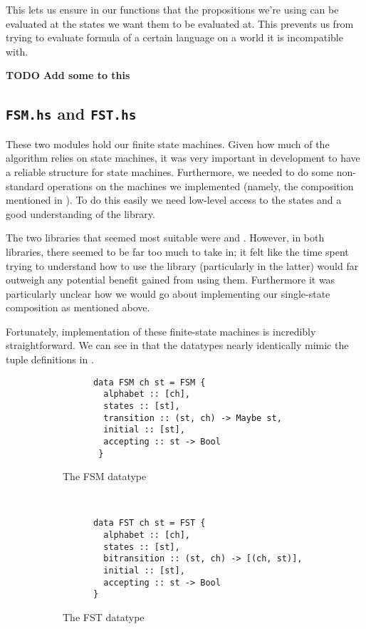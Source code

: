 \documentclass[12pt, a4paper]{article}
\begin{document}
This lets us ensure in our functions that the propositions we're using can be
evaluated at the states we want them to be evaluated at. This prevents us from
trying to evaluate formula of a certain language on a world it is incompatible
with.

\textbf{TODO Add some to this}

\subsection{\texttt{FSM.hs} and \texttt{FST.hs}}

These two modules hold our finite state machines. Given how much of the
algorithm relies on state machines, it was very important in development to have
a reliable structure for state machines. Furthermore, we needed to do some
non-standard operations on the machines we implemented (namely, the composition
mentioned in ). To do this easily we need
low-level access to the states and a good understanding of the library. 

The two libraries that seemed most suitable were \cite{HaskellFST} and
\cite{HaskellMachines}. However, in both libraries, there seemed to be far too
much to take in; it felt like the time spent trying to understand how to use the
library (particularly in the latter) would far outweigh any potential benefit
gained from using them. Furthermore it was particularly unclear how we would go
about implementing our single-state composition as mentioned above.

\bigskip

Fortunately, implementation of these finite-state machines is incredibly
straightforward. We can see in  that the datatypes nearly
identically mimic the tuple definitions in .


\begin{figure}[h]
  \centering
  \begin{subfigure}[b]{0.5\textwidth}
    \begin{verbatim}
      data FSM ch st = FSM {
        alphabet :: [ch],              
        states :: [st],               
        transition :: (st, ch) -> Maybe st,
        initial :: [st],            
        accepting :: st -> Bool    
       }
    \end{verbatim}
    \caption{The FSM datatype}
  \end{subfigure}%
~
  \begin{subfigure}[b]{0.5\textwidth}
    \begin{verbatim}
      data FST ch st = FST {
        alphabet :: [ch],                     
        states :: [st],                       
        bitransition :: (st, ch) -> [(ch, st)],
        initial :: [st],                      
        accepting :: st -> Bool              
      }
    \end{verbatim}
    \caption{The FST datatype}
  \end{subfigure}
  \caption{}
  \label{fig:FSMFST}
\end{figure}
\end{document}

